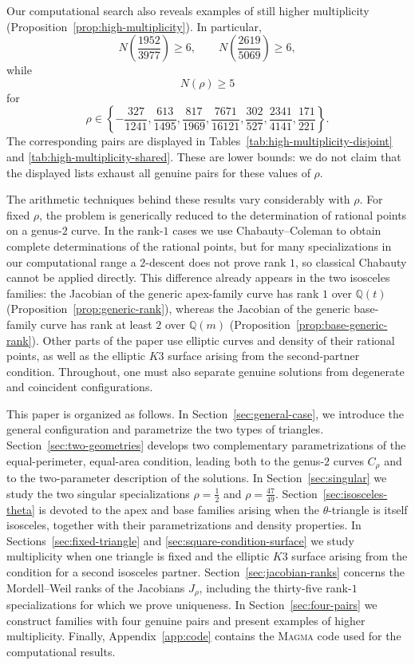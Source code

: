\documentclass[11pt]{amsart}
\theoremstyle{plain}
\theoremstyle{remark}
\theoremstyle{plain}
\newcommand{\Q}{\mathbb{Q}}
\begin{document}
Our computational search also reveals examples of still higher
multiplicity (Proposition~\ref{prop:high-multiplicity}). In particular,
\[
N\left(\frac{1952}{3977}\right)\geq6,
\qquad
N\left(\frac{2619}{5069}\right)\geq6,
\]
while
\[
N(\rho)\geq5
\]
for
\[
\rho\in
\left\{
-\frac{327}{1241},
\frac{613}{1495},
\frac{817}{1969},
\frac{7671}{16121},
\frac{302}{527},
\frac{2341}{4141},
\frac{171}{221}
\right\}.
\]
The corresponding pairs are displayed in
Tables~\ref{tab:high-multiplicity-disjoint} and
\ref{tab:high-multiplicity-shared}. These are lower bounds: we do not
claim that the displayed lists exhaust all genuine pairs for these
values of $\rho$.

The arithmetic techniques behind these results vary considerably with
$\rho$. For fixed $\rho$, the problem is generically reduced to the
determination of rational points on a genus-$2$ curve. In the
rank-$1$ cases we use Chabauty--Coleman to obtain complete
determinations of the rational points, but for many specializations in
our computational range a $2$-descent does not prove rank $1$, so
classical Chabauty cannot be applied directly. This difference already
appears in the two isosceles families: the Jacobian of the generic
apex-family curve has rank $1$ over $\Q(t)$ (Proposition~\ref{prop:generic-rank}), whereas the Jacobian of the
generic base-family curve has rank at least $2$ over $\Q(m)$ (Proposition~\ref{prop:base-generic-rank}). Other
parts of the paper use elliptic curves and density of their rational
points, as well as the elliptic $K3$ surface arising from the
second-partner condition. Throughout, one must also separate genuine
solutions from degenerate and coincident configurations.

This paper is organized as follows. In Section~\ref{sec:general-case},
we introduce the general configuration and parametrize the two types of
triangles. Section~\ref{sec:two-geometries} develops two complementary
parametrizations of the equal-perimeter, equal-area condition, leading
both to the genus-$2$ curves $C_\rho$ and to the two-parameter
description of the solutions. In Section~\ref{sec:singular} we study
the two singular specializations $\rho=\frac12$ and
$\rho=\frac{47}{49}$. Section~\ref{sec:isosceles-theta} is devoted to
the apex and base families arising when the $\theta$-triangle is itself
isosceles, together with their parametrizations and density properties.
In Sections~\ref{sec:fixed-triangle} and
\ref{sec:square-condition-surface} we study multiplicity when one
triangle is fixed and the elliptic $K3$ surface arising from the
condition for a second isosceles partner. Section~\ref{sec:jacobian-ranks}
concerns the Mordell--Weil ranks of the Jacobians $J_\rho$, including
the thirty-five rank-$1$ specializations for which we prove uniqueness.
In Section~\ref{sec:four-pairs} we construct families with four genuine
pairs and present examples of higher multiplicity. Finally,
Appendix~\ref{app:code} contains the \textsc{Magma} code used for the
computational results.
\end{document}
